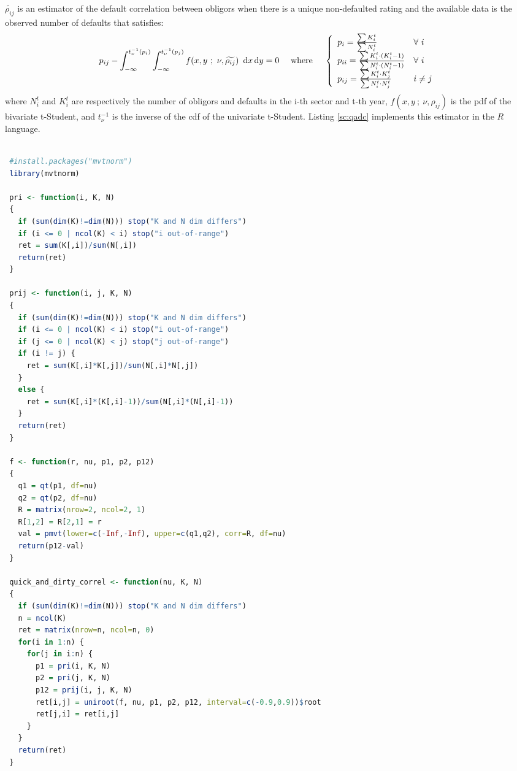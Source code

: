\documentclass[11pt,fleqn]{book} %
\begin{document}
\begin{definition}
	$\widetilde{\rho_{ij}}$ is an estimator of the default correlation between 
	obligors when there is a unique non-defaulted rating and the available data 
	is the observed number of defaults that satisfies:
	\begin{displaymath}
		p_{ij} - \displaystyle \int_{-\infty}^{t_{\nu}^{-1}(p_i)} \int_{-\infty}^{t_{\nu}^{-1}(p_j)} 
		f(x,y\ ;\ \nu, \widetilde{\rho_{ij}})\ \mathop{\mathrm{{}d}}\mathopen{} x \mathop{\mathrm{{}d}}\mathopen{} y = 0
		\quad \text{ where } \quad
		\left\{
			\begin{array}{ll}
				p_i = \frac{\sum K_i^t}{\sum N_i^t} & \forall\ i \\
				p_{ii} = \frac{\sum K_i^t \cdot (K_i^t-1)}{\sum N_i^t \cdot (N_i^t-1)} & \forall\ i \\
				p_{ij} = \frac{\sum K_i^t \cdot K_j^t}{\sum N_i^t \cdot N_j^t} & i \ne j \\
			\end{array}
		\right.
	\end{displaymath}
	where $N_i^t$ and $K_i^t$ are respectively the number of obligors and 
	defaults in the i-th sector and t-th year, $f(x,y\ ;\ \nu,\rho_{ij})$ 
	is the pdf of the bivariate t-Student, and $t_{\nu}^{-1}$ is the inverse 
	of the cdf of the univariate t-Student. Listing \ref{sc:qadc} implements
	this estimator in the $R$ language.
\end{definition}

\begin{lstlisting}[language=R, label=sc:qadc, caption=Quick-and-dirty correlation (R script)]

 #install.packages("mvtnorm")
 library(mvtnorm)

 pri <- function(i, K, N)
 {
   if (sum(dim(K)!=dim(N))) stop("K and N dim differs")
   if (i <= 0 | ncol(K) < i) stop("i out-of-range")
   ret = sum(K[,i])/sum(N[,i])
   return(ret)
 }

 prij <- function(i, j, K, N)
 {
   if (sum(dim(K)!=dim(N))) stop("K and N dim differs")
   if (i <= 0 | ncol(K) < i) stop("i out-of-range")
   if (j <= 0 | ncol(K) < j) stop("j out-of-range")
   if (i != j) {
     ret = sum(K[,i]*K[,j])/sum(N[,i]*N[,j])
   }
   else {
     ret = sum(K[,i]*(K[,i]-1))/sum(N[,i]*(N[,i]-1))
   }
   return(ret)
 }

 f <- function(r, nu, p1, p2, p12)
 {
   q1 = qt(p1, df=nu)
   q2 = qt(p2, df=nu)
   R = matrix(nrow=2, ncol=2, 1)
   R[1,2] = R[2,1] = r
   val = pmvt(lower=c(-Inf,-Inf), upper=c(q1,q2), corr=R, df=nu)
   return(p12-val)
 }

 quick_and_dirty_correl <- function(nu, K, N)
 {
   if (sum(dim(K)!=dim(N))) stop("K and N dim differs")
   n = ncol(K)
   ret = matrix(nrow=n, ncol=n, 0)
   for(i in 1:n) {
     for(j in i:n) {
       p1 = pri(i, K, N)
       p2 = pri(j, K, N)
       p12 = prij(i, j, K, N)
       ret[i,j] = uniroot(f, nu, p1, p2, p12, interval=c(-0.9,0.9))$root
       ret[j,i] = ret[i,j]
     }
   }
   return(ret)
 }

\end{lstlisting}
\end{document}
